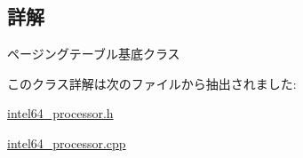 \subsection{詳解}
ページングテーブル基底クラス 

このクラス詳解は次のファイルから抽出されました\+:\begin{DoxyCompactItemize}
\item 
\hyperlink{intel64__processor_8h}{intel64\+\_\+processor.\+h}\item 
\hyperlink{intel64__processor_8cpp}{intel64\+\_\+processor.\+cpp}\end{DoxyCompactItemize}

